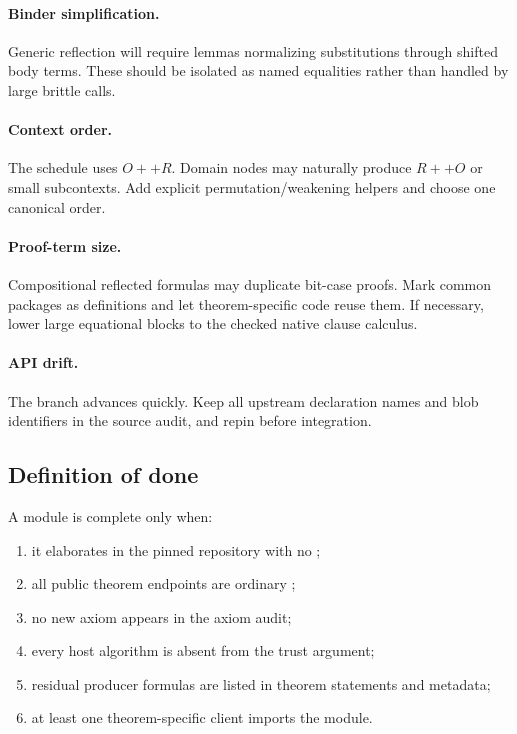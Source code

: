 \paragraph{Binder simplification.}
Generic reflection will require lemmas normalizing substitutions through shifted body terms.  These
should be isolated as named equalities rather than handled by large brittle  calls.

\paragraph{Context order.}
The schedule uses \(O++R\).  Domain nodes may naturally produce \(R++O\) or small subcontexts.  Add
explicit permutation/weakening helpers and choose one canonical order.

\paragraph{Proof-term size.}
Compositional reflected formulas may duplicate bit-case proofs.  Mark common packages as definitions
and let theorem-specific code reuse them.  If necessary, lower large equational blocks to the checked
native clause calculus.

\paragraph{API drift.}
The branch advances quickly.  Keep all upstream declaration names and blob identifiers in the source
audit, and repin before integration.

\subsection{Definition of done}

A module is complete only when:

\begin{enumerate}
\item it elaborates in the pinned repository with no ;
\item all public theorem endpoints are ordinary ;
\item no new axiom appears in the axiom audit;
\item every host algorithm is absent from the trust argument;
\item residual producer formulas are listed in theorem statements and metadata;
\item at least one theorem-specific client imports the module.
\end{enumerate}
